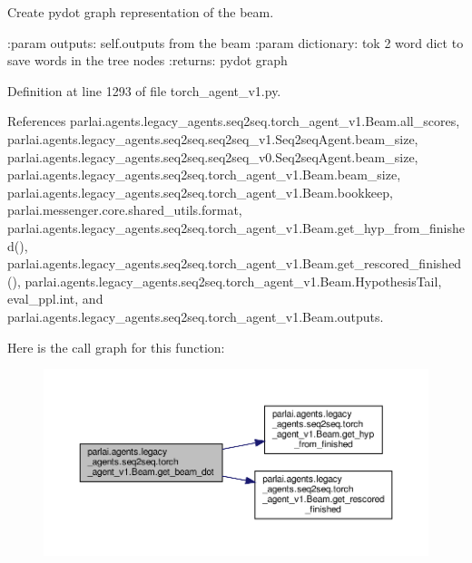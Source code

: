 \begin{DoxyVerb}Create pydot graph representation of the beam.

:param outputs: self.outputs from the beam
:param dictionary: tok 2 word dict to save words in the tree nodes
:returns: pydot graph
\end{DoxyVerb}
 

Definition at line 1293 of file torch\+\_\+agent\+\_\+v1.\+py.



References parlai.\+agents.\+legacy\+\_\+agents.\+seq2seq.\+torch\+\_\+agent\+\_\+v1.\+Beam.\+all\+\_\+scores, parlai.\+agents.\+legacy\+\_\+agents.\+seq2seq.\+seq2seq\+\_\+v1.\+Seq2seq\+Agent.\+beam\+\_\+size, parlai.\+agents.\+legacy\+\_\+agents.\+seq2seq.\+seq2seq\+\_\+v0.\+Seq2seq\+Agent.\+beam\+\_\+size, parlai.\+agents.\+legacy\+\_\+agents.\+seq2seq.\+torch\+\_\+agent\+\_\+v1.\+Beam.\+beam\+\_\+size, parlai.\+agents.\+legacy\+\_\+agents.\+seq2seq.\+torch\+\_\+agent\+\_\+v1.\+Beam.\+bookkeep, parlai.\+messenger.\+core.\+shared\+\_\+utils.\+format, parlai.\+agents.\+legacy\+\_\+agents.\+seq2seq.\+torch\+\_\+agent\+\_\+v1.\+Beam.\+get\+\_\+hyp\+\_\+from\+\_\+finished(), parlai.\+agents.\+legacy\+\_\+agents.\+seq2seq.\+torch\+\_\+agent\+\_\+v1.\+Beam.\+get\+\_\+rescored\+\_\+finished(), parlai.\+agents.\+legacy\+\_\+agents.\+seq2seq.\+torch\+\_\+agent\+\_\+v1.\+Beam.\+Hypothesis\+Tail, eval\+\_\+ppl.\+int, and parlai.\+agents.\+legacy\+\_\+agents.\+seq2seq.\+torch\+\_\+agent\+\_\+v1.\+Beam.\+outputs.

Here is the call graph for this function\+:
\nopagebreak
\begin{figure}[H]
\begin{center}
\leavevmode
\includegraphics[width=350pt]{classparlai_1_1agents_1_1legacy__agents_1_1seq2seq_1_1torch__agent__v1_1_1Beam_af4d7c9fd1fd93f59148fe7ab90c58da9_cgraph}
\end{center}
\end{figure}
\mbox{\label{classparlai_1_1agents_1_1legacy__agents_1_1seq2seq_1_1torch__agent__v1_1_1Beam_a5ae82a3d567dd8f282678d0ee40aa41e}} 
